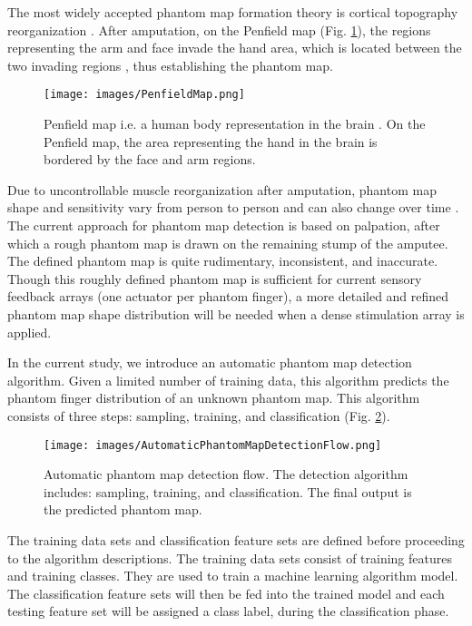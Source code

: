 The most widely accepted phantom map formation theory is cortical topography reorganization \cite{ramachandran1998perception}. After amputation, on the Penfield map (Fig. \ref{fig:penfiled_map}), the regions representing the arm and face invade the hand area, which is located  between the two invading regions \cite{cohen1991motor, ramachandran1998perception}, thus establishing the phantom map.  
 

\begin{figure}[htb]
    \centering
    \texttt{[image: images/PenfieldMap.png]}
    \caption{Penfield map i.e. a  human body representation in the brain \cite{penfield1950cerebral}. On the Penfield map, the area representing the hand in the brain is bordered by the face and arm regions. }
    \label{fig:penfiled_map}
\end{figure} 

Due to uncontrollable muscle reorganization after amputation, phantom map shape and sensitivity vary from person to person \cite{pirowska2014phantom, zhang2015somatotopical} and can also change over time \cite{ramachandran1998perception}. The current approach for phantom map detection is based on palpation, after which a rough phantom map is drawn on the remaining stump of the amputee. The defined phantom map is quite rudimentary, inconsistent, and inaccurate. Though this roughly defined phantom map is sufficient for current sensory feedback arrays (one actuator per phantom finger), a more detailed and refined phantom map shape distribution will be needed when a dense stimulation array is applied. 

In the current study, we introduce an automatic phantom map detection algorithm. Given a limited number of training data, this algorithm predicts the phantom finger distribution of an unknown phantom map. This algorithm consists of three steps: sampling, training, and classification (Fig. \ref{fig:AutomaticPhantomMapDetectionFlow}).

\begin{figure}[htb]
    \centering
    \texttt{[image: images/AutomaticPhantomMapDetectionFlow.png]}
    \caption{Automatic phantom map detection flow. The detection algorithm includes: sampling, training, and classification. The final output is the predicted phantom map. }
    \label{fig:AutomaticPhantomMapDetectionFlow}
\end{figure} 

The training data sets and classification feature sets are defined before proceeding to the algorithm descriptions. The training data sets consist of training features and training classes. They are used to train a machine learning algorithm model. The classification feature sets will then be fed into the trained model and each testing feature set will be assigned a class label, during the classification phase. 

